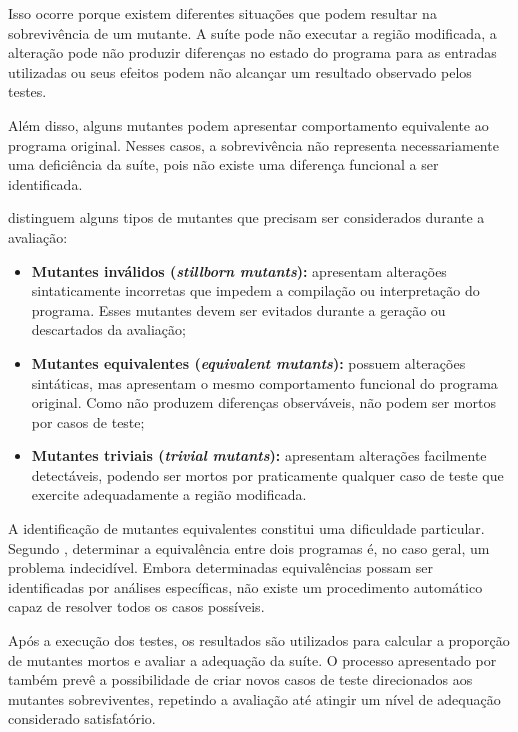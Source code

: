 Isso ocorre porque existem diferentes situações que podem resultar na sobrevivência de um mutante. A suíte pode não executar a região modificada, a alteração pode não produzir diferenças no estado do programa para as entradas utilizadas ou seus efeitos podem não alcançar um resultado observado pelos testes.

Além disso, alguns mutantes podem apresentar comportamento equivalente ao programa original. Nesses casos, a sobrevivência não representa necessariamente uma deficiência da suíte, pois não existe uma diferença funcional a ser identificada.

 distinguem alguns tipos de mutantes que precisam ser considerados durante a avaliação:

\begin{itemize}
    \item \textbf{Mutantes inválidos (\textit{stillborn mutants}):} apresentam alterações sintaticamente incorretas que impedem a compilação ou interpretação do programa. Esses mutantes devem ser evitados durante a geração ou descartados da avaliação;

    \item \textbf{Mutantes equivalentes (\textit{equivalent mutants}):} possuem alterações sintáticas, mas apresentam o mesmo comportamento funcional do programa original. Como não produzem diferenças observáveis, não podem ser mortos por casos de teste;

    \item \textbf{Mutantes triviais (\textit{trivial mutants}):} apresentam alterações facilmente detectáveis, podendo ser mortos por praticamente qualquer caso de teste que exercite adequadamente a região modificada.
\end{itemize}

A identificação de mutantes equivalentes constitui uma dificuldade particular. Segundo , determinar a equivalência entre dois programas é, no caso geral, um problema indecidível. Embora determinadas equivalências possam ser identificadas por análises específicas, não existe um procedimento automático capaz de resolver todos os casos possíveis.

Após a execução dos testes, os resultados são utilizados para calcular a proporção de mutantes mortos e avaliar a adequação da suíte. O processo apresentado por  também prevê a possibilidade de criar novos casos de teste direcionados aos mutantes sobreviventes, repetindo a avaliação até atingir um nível de adequação considerado satisfatório.

